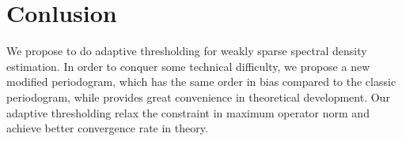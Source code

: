 \section*{Conlusion}
We propose to do adaptive thresholding for weakly sparse spectral density estimation. In order to conquer some technical difficulty, we propose a new modified periodogram, which has the same  order in bias compared to the classic periodogram, while provides great convenience in theoretical development. Our adaptive thresholding relax the constraint in maximum operator norm  and achieve better convergence rate in theory. 